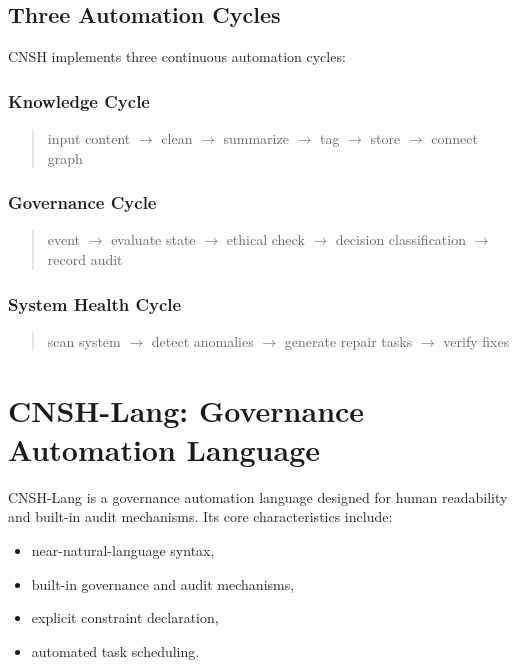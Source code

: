 \documentclass[conference]{IEEEtran}
\begin{document}
\subsection{Three Automation Cycles}

CNSH implements three continuous automation cycles:

\subsubsection{Knowledge Cycle}
\begin{quote}
input content $\to$ clean $\to$ summarize $\to$ tag
$\to$ store $\to$ connect graph
\end{quote}

\subsubsection{Governance Cycle}
\begin{quote}
event $\to$ evaluate state $\to$ ethical check
$\to$ decision classification $\to$ record audit
\end{quote}

\subsubsection{System Health Cycle}
\begin{quote}
scan system $\to$ detect anomalies $\to$ generate repair tasks
$\to$ verify fixes
\end{quote}

\section{CNSH-Lang: Governance Automation Language}

CNSH-Lang is a governance automation language designed for
human readability and built-in audit mechanisms.
Its core characteristics include:
\begin{itemize}[nosep]
  \item near-natural-language syntax,
  \item built-in governance and audit mechanisms,
  \item explicit constraint declaration,
  \item automated task scheduling.
\end{itemize}
\end{document}

